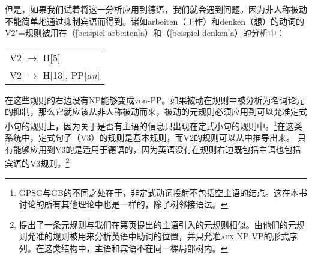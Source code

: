 但是，如果我们试着将这一分析应用到德语，我们就会遇到问题。因为非人称被动不能简单地通过抑制宾语而得到。诸如arbeiten（工作）和denken（想）的动词的V2"=规则被用在（\ref{beispiel-arbeiten}a）和（\ref{beispiel-denken}a）的分析中：
\ea
\begin{tabular}[t]{@{}l@{}}
V2 $\to$ H[5]\\
V2 $\to$ H[13], PP[\emph{an}]\\
\end{tabular}
\z
在这些规则的右边没有NP能够变成von-PP。如果被动在规则中被分析为名词论元的抑制，那么它就应该从非人称被动而来，被动的元规则必须应用到可以允准定式小句的规则上，因为关于是否有主语的信息只出现在定式小句的规则中。\footnote{%
GPSG与GB\indexgbc 的不同之处在于，非定式动词投射不包括空主语的结点。这在本书讨论的所有其他理论中也是一样的，除了树邻接语法\indextagc。
}在这类系统中，定式句子（V3）的规则是基本规则，而V2的规则可以从中推导出来。
只有能够应用到V3的是适用于德语的，因为英语没有在规则右边既包括主语也包括宾语的V3规则。\footnote{%
\citet[]{GKPS85a}提出了一条元规则与我们在第\pageref{subjekt-meta}页提出的主语引入的元规则相似。由他们的元规则允准的规则被用来分析英语中助词的位置，并只允准\textsc{aux} NP VP的形式序列。在这类结构中，主语和宾语不在同一棵局部树内。
}
